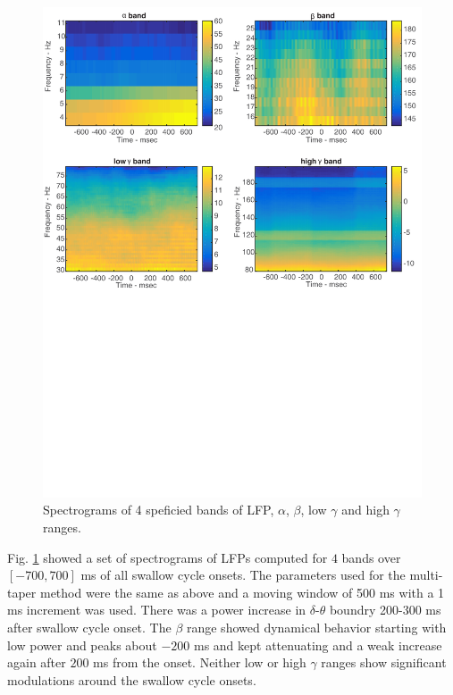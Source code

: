 \documentclass[letterpaper, 9pt, conference]{ieeeconf}
\begin{document}
\begin{figure}[ht!]
\begin{minipage}{20pc}
\includegraphics[scale=0.4]{spectrgram.pdf}
 \vspace{-2in}
\caption{\label{fig:psg} Spectrograms of 4 speficied bands of  LFP, $\alpha$, $\beta$, low $\gamma$ and high $\gamma$ ranges.}
\end{minipage}\hspace{2pc}
\end{figure}

Fig. \ref{fig:psg} showed a set of spectrograms of LFPs computed for $4$ bands over $[-700, 700]$ ms of all swallow cycle onsets. The parameters used for the multi-taper method were the same as above and a moving window of 500 ms with a 1 ms increment was used. There was a power increase in $\delta$-$\theta$ boundry 200-300 ms after swallow cycle onset. The $\beta$ range showed dynamical behavior starting with low power and peaks about $-200$ ms and kept attenuating and a weak increase again after $200$ ms from the onset. Neither low or high $\gamma$ ranges show significant modulations around the swallow cycle onsets.  
\end{document}
